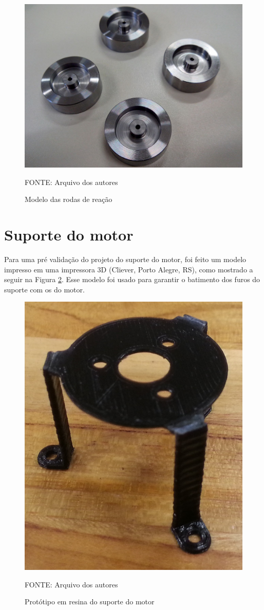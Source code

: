 \documentclass[
	12pt,				%
	openany,			%
	twoside,			%
	a4paper,			%
	english,			%
	french,				%
	spanish,			%
	brazil,				%
	oldfontcommands
	]{abntex2}
\begin{document}
\begin{figure}[th]
	\caption{Modelo das rodas de reação}
	\centering
	\includegraphics[width=0.7\linewidth]{./figs/Proto_RW}
	
	\begin{small}
		FONTE: Arquivo dos autores
	\end{small}
	\label{fig:ProtoRW}
\end{figure}

\section{Suporte do motor}

Para uma pré validação do projeto do suporte do motor, foi feito um modelo impresso em uma impressora 3D (Cliever, Porto Alegre, RS), como mostrado a seguir na Figura \ref{fig:ProtoMSP}. Esse modelo foi usado para garantir o batimento dos furos do suporte com os do motor.

\begin{figure}[th]
	\caption{Protótipo em resina do suporte do motor}
	\centering
	\includegraphics[width=0.5\linewidth]{./figs/Proto_3D}
	
	\begin{small}
		FONTE: Arquivo dos autores
	\end{small}
	\label{fig:ProtoMSP}
\end{figure}
\end{document}
